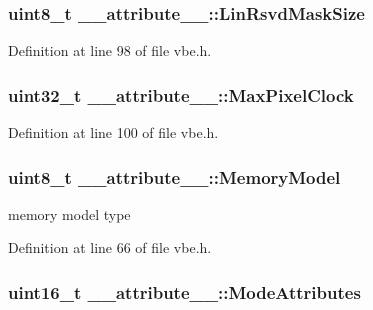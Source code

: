 \subsubsection[{Lin\+Rsvd\+Mask\+Size}]{\setlength{\rightskip}{0pt plus 5cm}uint8\+\_\+t \+\_\+\+\_\+attribute\+\_\+\+\_\+\+::\+Lin\+Rsvd\+Mask\+Size}\label{struct____attribute_____a577b5892a22d06e230f528a62a472d1d}


Definition at line 98 of file vbe.\+h.

\hypertarget{struct____attribute_____afd81a69353c35e8b1fb9b696931f79a5}{}
\subsubsection[{Max\+Pixel\+Clock}]{\setlength{\rightskip}{0pt plus 5cm}uint32\+\_\+t \+\_\+\+\_\+attribute\+\_\+\+\_\+\+::\+Max\+Pixel\+Clock}\label{struct____attribute_____afd81a69353c35e8b1fb9b696931f79a5}


Definition at line 100 of file vbe.\+h.

\hypertarget{struct____attribute_____a0fe34321b6dfba9e784fbbc649aa193a}{}
\subsubsection[{Memory\+Model}]{\setlength{\rightskip}{0pt plus 5cm}uint8\+\_\+t \+\_\+\+\_\+attribute\+\_\+\+\_\+\+::\+Memory\+Model}\label{struct____attribute_____a0fe34321b6dfba9e784fbbc649aa193a}


memory model type 



Definition at line 66 of file vbe.\+h.

\hypertarget{struct____attribute_____a68ea99ad36679e583fa9674016e30903}{}
\subsubsection[{Mode\+Attributes}]{\setlength{\rightskip}{0pt plus 5cm}uint16\+\_\+t \+\_\+\+\_\+attribute\+\_\+\+\_\+\+::\+Mode\+Attributes}\label{struct____attribute_____a68ea99ad36679e583fa9674016e30903}


